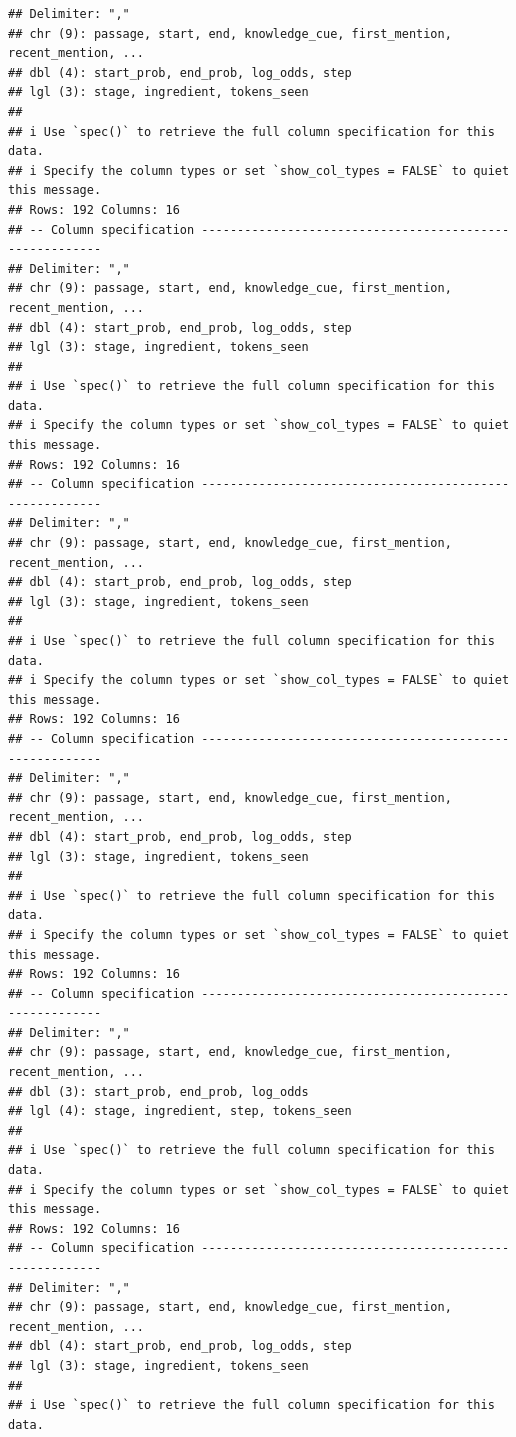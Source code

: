 \documentclass[
]{article}
\begin{document}
\begin{verbatim}
## Delimiter: ","
## chr (9): passage, start, end, knowledge_cue, first_mention, recent_mention, ...
## dbl (4): start_prob, end_prob, log_odds, step
## lgl (3): stage, ingredient, tokens_seen
## 
## i Use `spec()` to retrieve the full column specification for this data.
## i Specify the column types or set `show_col_types = FALSE` to quiet this message.
## Rows: 192 Columns: 16
## -- Column specification --------------------------------------------------------
## Delimiter: ","
## chr (9): passage, start, end, knowledge_cue, first_mention, recent_mention, ...
## dbl (4): start_prob, end_prob, log_odds, step
## lgl (3): stage, ingredient, tokens_seen
## 
## i Use `spec()` to retrieve the full column specification for this data.
## i Specify the column types or set `show_col_types = FALSE` to quiet this message.
## Rows: 192 Columns: 16
## -- Column specification --------------------------------------------------------
## Delimiter: ","
## chr (9): passage, start, end, knowledge_cue, first_mention, recent_mention, ...
## dbl (4): start_prob, end_prob, log_odds, step
## lgl (3): stage, ingredient, tokens_seen
## 
## i Use `spec()` to retrieve the full column specification for this data.
## i Specify the column types or set `show_col_types = FALSE` to quiet this message.
## Rows: 192 Columns: 16
## -- Column specification --------------------------------------------------------
## Delimiter: ","
## chr (9): passage, start, end, knowledge_cue, first_mention, recent_mention, ...
## dbl (4): start_prob, end_prob, log_odds, step
## lgl (3): stage, ingredient, tokens_seen
## 
## i Use `spec()` to retrieve the full column specification for this data.
## i Specify the column types or set `show_col_types = FALSE` to quiet this message.
## Rows: 192 Columns: 16
## -- Column specification --------------------------------------------------------
## Delimiter: ","
## chr (9): passage, start, end, knowledge_cue, first_mention, recent_mention, ...
## dbl (3): start_prob, end_prob, log_odds
## lgl (4): stage, ingredient, step, tokens_seen
## 
## i Use `spec()` to retrieve the full column specification for this data.
## i Specify the column types or set `show_col_types = FALSE` to quiet this message.
## Rows: 192 Columns: 16
## -- Column specification --------------------------------------------------------
## Delimiter: ","
## chr (9): passage, start, end, knowledge_cue, first_mention, recent_mention, ...
## dbl (4): start_prob, end_prob, log_odds, step
## lgl (3): stage, ingredient, tokens_seen
## 
## i Use `spec()` to retrieve the full column specification for this data.

\end{verbatim}
\end{document}
